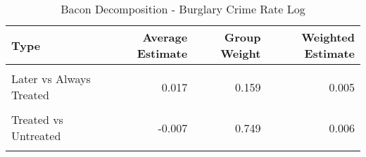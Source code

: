 \begin{table}[H]

\caption{\label{tab:tab:bacondecompositionBurglary}Bacon Decomposition - Burglary Crime Rate Log}
\centering
\begin{tabular}[t]{lrrr}
\toprule
Type & Average Estimate & Group Weight & Weighted Estimate\\
\midrule
\cellcolor{gray!6}{Earlier vs Later Treated} & \cellcolor{gray!6}{-0.015} & \cellcolor{gray!6}{0.068} & \cellcolor{gray!6}{-0.002}\\
Later vs Always Treated & 0.017 & 0.159 & 0.005\\
\cellcolor{gray!6}{Later vs Earlier Treated} & \cellcolor{gray!6}{-0.016} & \cellcolor{gray!6}{0.023} & \cellcolor{gray!6}{-0.001}\\
Treated vs Untreated & -0.007 & 0.749 & 0.006\\
\cellcolor{gray!6}{Total TWFE} & \cellcolor{gray!6}{NaN} & \cellcolor{gray!6}{NaN} & \cellcolor{gray!6}{0.008}\\
\bottomrule
\end{tabular}
\end{table}
